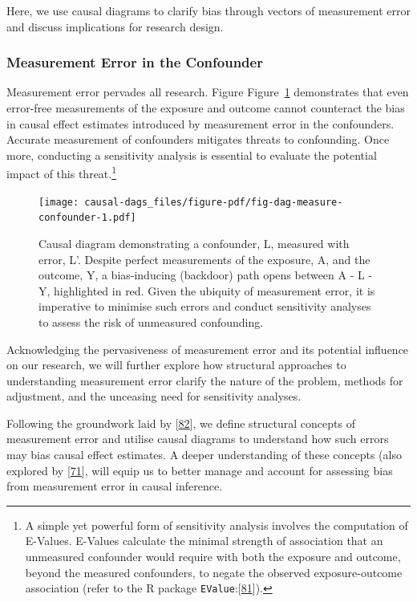 \documentclass[
  singlecolumn]{article}
\begin{document}
Here, we use causal diagrams to clarify bias through vectors of
measurement error and discuss implications for research design.

\hypertarget{measurement-error-in-the-confounder}{%
\subsubsection{Measurement Error in the
Confounder}\label{measurement-error-in-the-confounder}}

Measurement error pervades all research. Figure
Figure~\ref{fig-dag-measure-confounder} demonstrates that even
error-free measurements of the exposure and outcome cannot counteract
the bias in causal effect estimates introduced by measurement error in
the confounders. Accurate measurement of confounders mitigates threats
to confounding. Once more, conducting a sensitivity analysis is
essential to evaluate the potential impact of this threat.\footnote{A
  simple yet powerful form of sensitivity analysis involves the
  computation of E-Values. E-Values calculate the minimal strength of
  association that an unmeasured confounder would require with both the
  exposure and outcome, beyond the measured confounders, to negate the
  observed exposure-outcome association (refer to the R package
  \texttt{EValue}:{[}\protect\hyperlink{ref-mathur2018}{81}{]}).}

\begin{figure}

{\centering \texttt{[image: causal-dags\_files/figure-pdf/fig-dag-measure-confounder-1.pdf]}

}

\caption{\label{fig-dag-measure-confounder}Causal diagram demonstrating
a confounder, L, measured with error, L'. Despite perfect measurements
of the exposure, A, and the outcome, Y, a bias-inducing (backdoor) path
opens between A - L - Y, highlighted in red. Given the ubiquity of
measurement error, it is imperative to minimise such errors and conduct
sensitivity analyses to assess the risk of unmeasured confounding.}

\end{figure}

Acknowledging the pervasiveness of measurement error and its potential
influence on our research, we will further explore how structural
approaches to understanding measurement error clarify the nature of the
problem, methods for adjustment, and the unceasing need for sensitivity
analyses.

Following the groundwork laid by
{[}\protect\hyperlink{ref-hernuxe1n2009}{82}{]}, we define structural
concepts of measurement error and utilise causal diagrams to understand
how such errors may bias causal effect estimates. A deeper understanding
of these concepts (also explored by
{[}\protect\hyperlink{ref-vanderweele2012}{71}{]}, will equip us to
better manage and account for assessing bias from measurement error in
causal inference.
\end{document}
